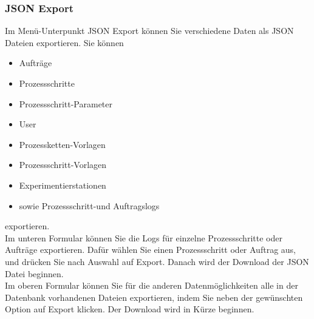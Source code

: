 \documentclass[enabledeprecatedfontcommands,fontsize=12pt,paper=a4,twoside]{scrartcl}
\begin{document}
\subsubsection{JSON Export}

Im Menü-Unterpunkt JSON Export können Sie verschiedene Daten als JSON Dateien exportieren. Sie können 
\begin{itemize}
\item Aufträge
\item Prozessschritte
\item Prozessschritt-Parameter
\item User
\item Prozessketten-Vorlagen
\item Prozessschritt-Vorlagen
\item Experimentierstationen
\item sowie Prozessschritt-und Auftragslogs 
\end{itemize}
exportieren. \\

Im unteren Formular können Sie die Logs für einzelne Prozessschritte oder Aufträge exportieren. Dafür wählen Sie einen Prozessschritt oder Auftrag aus, und drücken Sie nach Auswahl auf Export. Danach wird der Download der JSON Datei beginnen. \\

Im oberen Formular können Sie für die anderen Datenmöglichkeiten alle in der Datenbank vorhandenen Dateien exportieren, indem Sie neben der gewünschten Option auf Export klicken. Der Download wird in Kürze beginnen. \\
\end{document}
